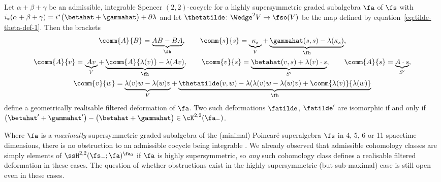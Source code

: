 \begin{Theorem}\label{thm:admiss-coycle-integr}
	Let $\alpha+\beta+\gamma$ be an admissible, integrable Spencer $(2,2)$-cocycle for a highly supersymmetric graded subalgebra $\fa$ of $\fs$ with $i_*(\alpha+\beta+\gamma)=i^*\bigl(\betahat+\gammahat\bigr)+\partial\lambda$ and let $\thetatilde\colon\Wedge^2V\to\fso(V)$ be the map defined by equation~\eqref{eq:tilde-theta-def-1}. Then the brackets
	\begin{gather*}
			\comm{A}{B} = \underbrace{AB-BA}_\fh,\qquad
			\comm{s}{s} = \underbrace{\kappa_s}_V + \underbrace{\gammahat(s,s) - \lambda(\kappa_s)}_\fh,\\
			\comm{A}{v}= \underbrace{Av}_V + \underbrace{\comm{A}{\lambda(v)} - \lambda(Av)}_\fh,\qquad
			\comm{v}{s} = \underbrace{\betahat(v,s) + \lambda(v)\cdot s}_{S'},\qquad
			\comm{A}{s} = \underbrace{A\cdot s}_{S'},
	\\
		\comm{v}{w} = \underbrace{\lambda(v)w-\lambda(w)v}_V + \underbrace{\thetatilde(v,w) - \lambda(\lambda(v)w-\lambda(w)v) + \comm{\lambda(v)}{\lambda(w)}}_\fh \label{eq:admiss-cocycle-brackets}
	\end{gather*}
	define a geometrically realisable filtered deformation of $\fa$. Two such deformations $\fatilde$, $\fatilde'$ are isomorphic if and only if $\bigl(\betahat'+\gammahat'\bigr)-\bigl(\betahat+\gammahat\bigr)\in\cK^{2,2}(\fa_-)$.
\end{Theorem}

Where $\fa$ is a \emph{maximally} supersymmetric graded subalgebra of the (minimal) Poincar\'e superalgebra $\fs$ in 4, 5, 6 or 11 spacetime dimensions, there is no obstruction to an admissible cocycle being integrable \cite{Beckett2021,deMedeiros2016,deMedeiros2018,Figueroa-OFarrill2017}. We already observed that admissible cohomology classes are simply elements of $\ssH^{2,2}(\fs_-;\fa)^{\fa_0}$ if $\fa$ is highly supersymmetric, so \emph{any} such cohomology class defines a realisable filtered deformation in these cases. The question of whether obstructions exist in the highly supersymmetric (but sub-maximal) case is still open even in these cases.
